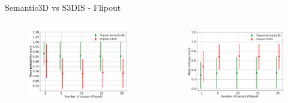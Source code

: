 \documentclass[aspectratio=169]{beamer}
\begin{document}
\begin{frame}{Semantic3D vs S3DIS - Flipout}
    \begin{columns}
        \begin{column}{0.5\textwidth}
            \begin{figure}
                \centering
                \includegraphics[scale=0.28]{images/ood1/MSP_Mean_OOD1_Fout.jpg}
            \end{figure}
        \end{column}
        \begin{column}{0.5\textwidth}
            \begin{figure}
                \centering
                \includegraphics[scale=0.28]{images/ood1/Ent_Mean_OOD1_Fout.jpg}
            \end{figure}
        \end{column}
    \end{columns}
\end{frame}
\end{document}
